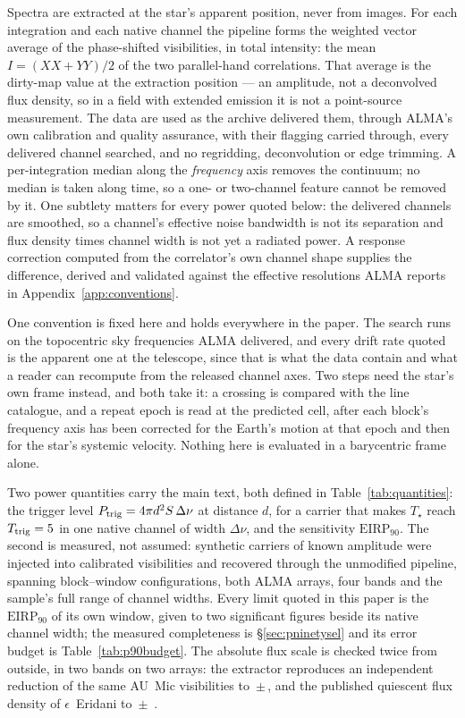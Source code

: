 Spectra are extracted at the star's apparent position, never from images.
For each integration and each native channel the pipeline forms the weighted
vector average of the phase-shifted visibilities, in total intensity: the
mean $I=(XX+YY)/2$ of the two parallel-hand correlations. That average is the
dirty-map value at the extraction position --- an amplitude, not a
deconvolved flux density, so in a field with extended emission it is not a
point-source measurement. The data are used as the archive delivered them,
through ALMA's own calibration and quality assurance, with their flagging
carried through, every delivered channel searched, and no regridding,
deconvolution or edge trimming. A per-integration median along the
\emph{frequency} axis removes the continuum; no median is taken along
time, so a one- or two-channel feature cannot be removed by it. One
subtlety matters for every power quoted below: the delivered channels are
smoothed, so a channel's effective noise bandwidth is not its separation and
flux density times channel width is not yet a radiated power. A response
correction computed from the correlator's own channel shape supplies the
difference, derived and validated against the effective resolutions ALMA
reports in Appendix~\ref{app:conventions}.

One convention is fixed here and holds everywhere in the paper. The search
runs on the topocentric sky frequencies ALMA delivered, and every drift rate
quoted is the apparent one at the telescope, since that is what the data
contain and what a reader can recompute from the released channel axes. Two
steps need the star's own frame instead, and both take it: a crossing is
compared with the line catalogue, and a repeat epoch is read at the predicted
cell, after each block's frequency axis has been corrected for the Earth's
motion at that epoch and then for the star's systemic velocity. Nothing here
is evaluated in a barycentric frame alone.

Two power quantities carry the main text, both defined in
Table~\ref{tab:quantities}: the trigger level $P_{\rm trig} = 4\pi
d^{2}S\,\Delta\nu$ at distance $d$, for a carrier that makes $T_\star$ reach
$T_{\rm trig}=5$ in one native channel of width $\Delta\nu$,
and the sensitivity $\mathrm{EIRP}_{90}$. The second is measured, not
assumed: \SelNTone{} synthetic carriers of known amplitude were injected into
calibrated visibilities and recovered through the unmodified pipeline,
spanning \SelNUnit{} block--window configurations, both ALMA arrays, four
bands and the sample's full range of channel widths. Every limit quoted in
this paper is the $\mathrm{EIRP}_{90}$ of its own window, given to two
significant figures beside its native channel width; the measured
completeness is \S\ref{sec:pninetysel} and its error
budget is Table~\ref{tab:p90budget}. The absolute flux scale is checked twice from
outside, in two bands on two arrays: the extractor reproduces an
independent reduction of the same AU~Mic visibilities to
\PxJanRatio\,$\pm$\,\PxJanRatioErr, and the published quiescent flux
density of $\epsilon$~Eridani to \PxEpsRatio\,$\pm$\,\PxEpsRatioErr{}
\citep{Burton2022}.


